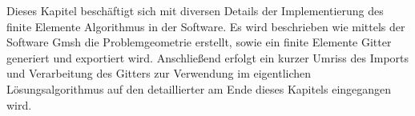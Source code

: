 Dieses Kapitel beschäftigt sich mit diversen Details der Implementierung des finite Elemente Algorithmus in der Software. Es wird beschrieben wie mittels der Software Gmsh die Problemgeometrie erstellt, sowie ein finite Elemente Gitter generiert und exportiert wird. Anschließend erfolgt ein kurzer Umriss des Imports und Verarbeitung des Gitters zur Verwendung im eigentlichen Lösungsalgorithmus auf den detaillierter am Ende dieses Kapitels eingegangen wird.